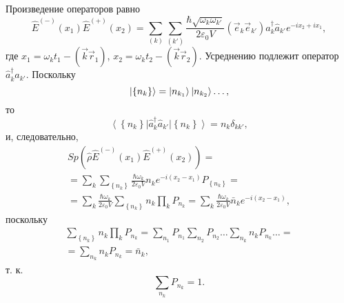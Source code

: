 Произведение операторов равно
\begin{equation}
\hat{E}^{(-)}\left(x_1\right)
\hat{E}^{(+)}\left(x_2\right) = \sum_{(k)}\sum_{(k')}
\frac{\hbar \sqrt{\omega_k \omega_{k'}}}{2 \varepsilon_0 V}
\left(\vec{e}_k\vec{e}_{k'}\right)
\hat{a}_k^{\dag}\hat{a}_{k'}
e^{-i x_2 + i x_1},
\label{eqCh4_21}
\end{equation}
где  $x_1 = \omega_k t_1 - \left(\vec{k}\vec{r}_1\right)$,
$x_2 = \omega_k t_2 - \left(\vec{k}\vec{r}_2\right)$.
Усреднению подлежит оператор $\hat{a}_k^{\dag}\hat{a}_{k'}$. Поскольку
\[\left|\left\{n_{k}\right\}\right> = 
\ket{n_{k_1}}
\ket{n_{k_2}} \dots,
\] 
то 
\[
\left<\left\{n_{k}\right\}\right|
\hat{a}_k^{\dag}\hat{a}_{k'}
\left|\left\{n_{k}\right\}\right> = 
n_k \delta_{kk'},
\]
и, следовательно, 
\begin{eqnarray}
Sp \left(
\hat{\rho}\hat{E}^{(-)}\left(x_1\right)
\hat{E}^{(+)}\left(x_2\right)
\right) = 
\nonumber \\
=\sum_{k}\sum_{\left\{n_{k}\right\}}
\frac{\hbar \omega_k}{2 \varepsilon_0 V} n_k e^{-i \left(x_2 - x_1
  \right)} 
P_{\left\{n_k\right\}} =
\nonumber \\
= \sum_{k}
\frac{\hbar \omega_k}{2 \varepsilon_0 V}
\sum_{\left\{n_{k}\right\}} n_k
\prod_k P_{n_k} =
\sum_{k} 
\frac{\hbar \omega_k}{2 \varepsilon_0 V}
\bar{n}_k e^{-i \left(x_2 - x_1\right)},
\nonumber
\end{eqnarray}
поскольку
\begin{eqnarray}
\sum_{\left\{n_{k}\right\}} n_k
\prod_kP_{n_k} = 
\sum_{n_1}P_{n_1} 
\sum_{n_2}P_{n_2}
\dots
\sum_{n_k}n_kP_{n_k}
\dots = 
\nonumber \\
=   \sum_{n_k}n_kP_{n_k} = \bar{n}_k,
\nonumber
\end{eqnarray}
т. к.
\[
\sum_{n_k}P_{n_k} = 1.
\]

